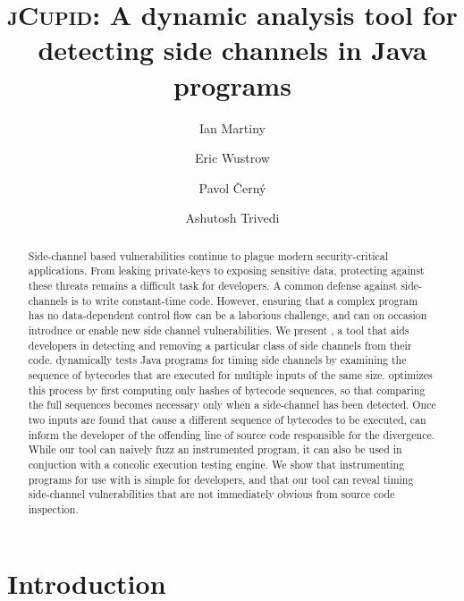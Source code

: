 \documentclass{llncs}
\begin{document}
\title{\textsc{jCupid}: A dynamic analysis tool for detecting side channels in Java programs}
\author{
  Ian Martiny
  \and
  Eric Wustrow
  \and
  Pavol {\v C}ern\'y
  \and
  Ashutosh Trivedi
}


\maketitle

\begin{abstract}
  Side-channel based vulnerabilities continue to plague modern security-critical
  applications.
  From leaking private-keys to exposing sensitive data, 
  protecting against these threats remains a difficult task for developers. 
  A common defense against side-channels is to write constant-time code.
  However, ensuring that a complex program has no data-dependent control flow
  can be a laborious challenge, and can on occasion introduce or enable new side
  channel vulnerabilities.
  We present \jcupid, a tool that aids developers in detecting and
  removing a particular class of side channels from their code.
  \jcupid dynamically tests Java programs for timing side channels by examining
  the sequence of bytecodes that are executed for multiple inputs of the same size.
  \jcupid optimizes this process by first computing only hashes of bytecode sequences,
  so that comparing the full sequences becomes necessary only when a side-channel has been detected.
  Once two inputs are found that cause a different sequence of bytecodes to be
  executed, \jcupid can inform the developer of the offending line of source code
  responsible for the divergence.
  While our tool can naively fuzz an instrumented program, it can also be used
  in conjuction with a concolic execution testing engine.
  We show that instrumenting programs for use with \jcupid is simple for
  developers, and that our tool can reveal timing side-channel vulnerabilities
  that are not immediately obvious from source code inspection.
\end{abstract}



\section{Introduction}
\label{sec:introduction}

\end{document}
